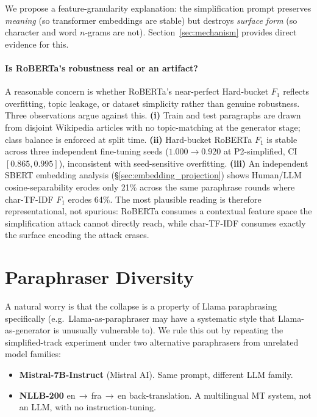 \documentclass[11pt,a4paper]{article}
\begin{document}
We propose a feature-granularity explanation: the simplification prompt
preserves \emph{meaning} (so transformer embeddings are stable) but
destroys \emph{surface form} (so character and word $n$-grams are not).
Section~\ref{sec:mechanism} provides direct evidence for this.

\paragraph{Is RoBERTa's robustness real or an artifact?}
A reasonable concern is whether RoBERTa's near-perfect Hard-bucket $F_1$
reflects overfitting, topic leakage, or dataset simplicity rather than
genuine robustness. Three observations argue against this. \textbf{(i)}
Train and test paragraphs are drawn from disjoint Wikipedia articles with no
topic-matching at the generator stage; class balance is enforced at split
time. \textbf{(ii)} Hard-bucket RoBERTa $F_1$ is stable across three
independent fine-tuning seeds ($1.000 \to 0.920$ at P2-simplified, CI
$[0.865, 0.995]$), inconsistent with seed-sensitive overfitting.
\textbf{(iii)} An independent SBERT embedding analysis
(\S\ref{sec:embedding_projection}) shows Human/LLM cosine-separability
erodes only 21\% across the same paraphrase rounds where char-TF-IDF $F_1$
erodes 64\%. The most plausible reading is therefore representational, not
spurious: RoBERTa consumes a contextual feature space the simplification
attack cannot directly reach, while char-TF-IDF consumes exactly the surface
encoding the attack erases.

\section{Paraphraser Diversity}
\label{sec:paraphraser_diversity}

A natural worry is that the collapse is a property of Llama paraphrasing
specifically (e.g.\ Llama-as-paraphraser may have a systematic style that
Llama-as-generator is unusually vulnerable to). We rule this out by repeating
the simplified-track experiment under two alternative paraphrasers from
unrelated model families:

\begin{itemize}
\item \textbf{Mistral-7B-Instruct} (Mistral AI). Same prompt, different LLM family.
\item \textbf{NLLB-200} en\,$\to$\,fra\,$\to$\,en back-translation. A
multilingual MT system, not an LLM, with no instruction-tuning.
\end{itemize}
\end{document}
